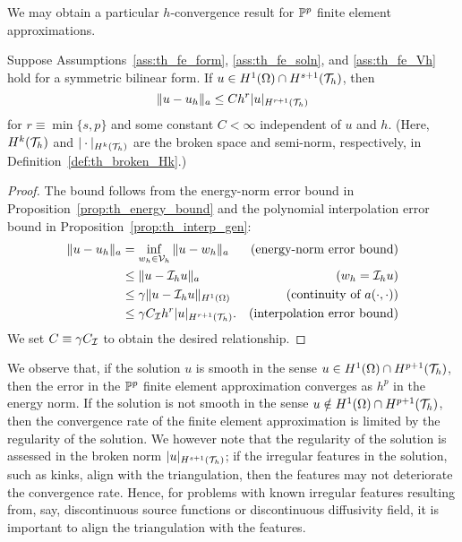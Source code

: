 We may obtain a particular $h$-convergence result for $\mathbb{P}^p$ finite element approximations.
\begin{proposition}
  \label{prop:th_energy_bound_poly}
  Suppose Assumptions~\ref{ass:th_fe_form}, \ref{ass:th_fe_soln}, and \ref{ass:th_fe_Vh} hold for a symmetric bilinear form. If $u \in H^1(\Omega) \cap H^{s+1}(\mathcal{T}_h)$, then
  \begin{equation*}
    \| u - u_h \|_a \leq C h^r | u |_{H^{r+1}(\mathcal{T}_h)}
  \end{equation*}
  for $r \equiv \min\{s,p\}$ and some constant $C < \infty$ independent of $u$ and $h$.  (Here, $H^k(\mathcal{T}_h)$ and $| \cdot |_{H^{k}(\mathcal{T}_h)}$ are the broken space and semi-norm, respectively, in Definition~\ref{def:th_broken_Hk}.)
  \begin{proof}
    The bound follows from the energy-norm error bound in Proposition~\eqref{prop:th_energy_bound} and the polynomial interpolation error bound in Proposition~\ref{prop:th_interp_gen}:
    \begin{align*}
      \| u - u_h \|_a &= \inf_{w_h \in \mathcal{V}_h} \| u - w_h \|_a
      & \text{(energy-norm error bound)}  \\
      &\leq \| u - \mathcal{I}_h u \|_a &\text{($w_h = \mathcal{I}_h u$)} \\
      &\leq \gamma \| u - \mathcal{I}_h u \|_{H^1(\Omega)} &\text{(continuity of $a(\cdot,\cdot)$)} \\
      &\leq \gamma C_{\mathcal{I}} h^r | u |_{H^{r+1}(\mathcal{T}_h)}. &\text{(interpolation error bound)}
    \end{align*}
    We set $C \equiv \gamma C_{\mathcal{I}}$ to obtain the desired relationship.
  \end{proof}
\end{proposition}

We observe that, if the solution $u$ is smooth in the sense $u \in H^1(\Omega) \cap H^{p+1}(\mathcal{T}_h)$, then the error in the $\mathbb{P}^p$ finite element approximation converges as $h^p$ in the energy norm.  If the solution is not smooth in the sense $u \notin H^1(\Omega) \cap H^{p+1}(\mathcal{T}_h)$, then the convergence rate of the finite element approximation is limited by the regularity of the solution.  We however note that the regularity of the solution is assessed in the broken norm $| u |_{H^{s+1}(\mathcal{T}_h)}$; if the irregular features in the solution, such as kinks, align with the triangulation, then the features may not deteriorate the convergence rate.  Hence, for problems with known irregular features resulting from, say, discontinuous source functions or discontinuous diffusivity field, it is important to align the triangulation with the features.

